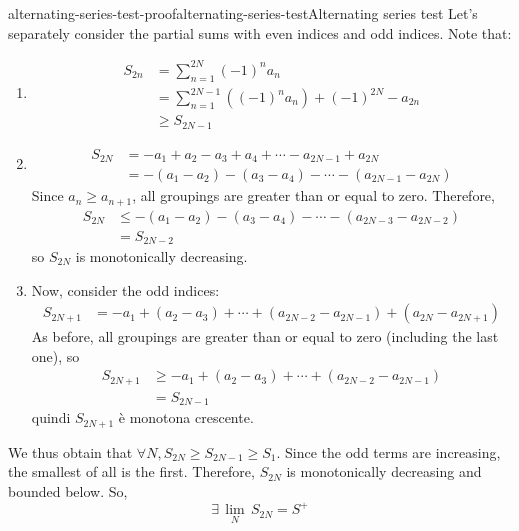 \documentclass[preview]{standalone}
\begin{document}
\begin{snippetproof}{alternating-series-test-proof}{alternating-series-test}{Alternating series test}
    Let's separately consider the partial sums with even indices and odd indices.
    Note that:
    \begin{enumerate}
        \item \begin{align*}
            S_{2n} &= \sum_{n=1}^{2N} {(-1)}^n a_n \\
            &= \sum_{n=1}^{2N-1} \left({(-1)}^n a_n \right) + {(-1)}^{2N} - a_{2n} \\
            &\geq S_{2N-1}
        \end{align*}
        \item \begin{align*}
            S_{2N} &= -a_1 + a_2 -a_3 + a_4 + \cdots - a_{2N-1} + a_{2N} \\
            &= -(a_1 - a_2) -(a_3 - a_4) - \cdots - (a_{2N-1} - a_{2N})
        \end{align*}
        Since \(a_n \geq a_{n+1}\), all groupings are greater than or equal to zero.
        Therefore,
        \begin{align*}
            S_{2N} &\leq -(a_1 - a_2) - (a_3 - a_4) - \cdots - (a_{2N-3} - a_{2N-2}) \\
            &= S_{2N - 2}
        \end{align*}
        so \(S_{2N}\) is monotonically decreasing.
        \item Now, consider the odd indices:
        \begin{align*}
            S_{2N + 1} &= -a_1 + (a_2 - a_3) + \cdots + (a_{2N-2} - a_{2N-1})
            + (a_{2N} - a_{2N+1})
        \end{align*}
        As before, all groupings are greater than or equal to zero (including the last one),
        so
        \begin{align*}
            S_{2N + 1} &\geq -a_1 + (a_2 - a_3) + \cdots + (a_{2N-2} - a_{2N-1}) \\
            &= S_{2N-1}
        \end{align*}
        quindi \(S_{2N+1}\) è monotona crescente.
    \end{enumerate}
    We thus obtain that \(\forall N, S_{2N} \geq S_{2N-1} \geq S_1\). Since the odd terms are increasing, the smallest of all is the first.
    Therefore, \(S_{2N}\) is monotonically decreasing and bounded below.
    So,
    \[
        \exists\, \underset{N}{\lim}\, S_{2N} = S^+
    \]

\end{snippetproof}
\end{document}
